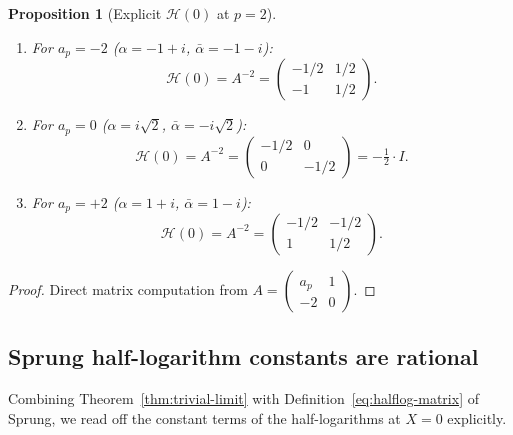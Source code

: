 \documentclass[11pt,a4paper]{amsart}
\newtheorem{proposition}[theorem]{Proposition}
\theoremstyle{definition}
\newcommand{\Hcal}{\mathcal{H}}
\begin{document}
\begin{proposition}[Explicit $\Hcal(0)$ at $p=2$]\label{prop:H-explicit-p2}
\hspace{0pt}
\begin{enumerate}
\item[(i)] For $a_p = -2$ ($\alpha = -1+i$, $\bar\alpha = -1-i$):
\[
\Hcal(0) = A^{-2} = \begin{pmatrix} -1/2 & 1/2 \\ -1 & 1/2 \end{pmatrix}.
\]
\item[(ii)] For $a_p = 0$ ($\alpha = i\sqrt{2}$, $\bar\alpha = -i\sqrt{2}$):
\[
\Hcal(0) = A^{-2} = \begin{pmatrix} -1/2 & 0 \\ 0 & -1/2 \end{pmatrix} = -\tfrac{1}{2} \cdot I.
\]
\item[(iii)] For $a_p = +2$ ($\alpha = 1+i$, $\bar\alpha = 1-i$):
\[
\Hcal(0) = A^{-2} = \begin{pmatrix} -1/2 & -1/2 \\ 1 & 1/2 \end{pmatrix}.
\]
\end{enumerate}
\end{proposition}

\begin{proof}
Direct matrix computation from $A = \begin{pmatrix} a_p & 1 \\ -2 & 0 \end{pmatrix}$.
\end{proof}

\subsection{Sprung half-logarithm constants are rational}

Combining Theorem~\ref{thm:trivial-limit} with Definition~\ref{eq:halflog-matrix} of Sprung, we read off the constant terms of the half-logarithms at $X = 0$ explicitly.
\end{document}

